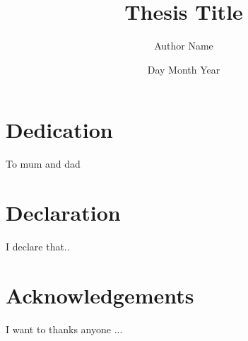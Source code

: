 \documentclass[12pt,twoside]{report}
\title{Thesis Title}
\author{Author Name}
\date{Day Month Year}
\begin{document}
	
	

	\chapter*{Dedication}
	To mum and dad

	\chapter*{Declaration}
	I declare that..

	\chapter*{Acknowledgements}
	I want to thanks anyone ...

	\tableofcontents
	\listoffigures
	\listoftables

	\nocite{*} %
	\pagestyle{plain}
	\printbibliography[
		heading=bibintoc,
	]


	

	

	

	

	

	\appendix
	
\end{document}
